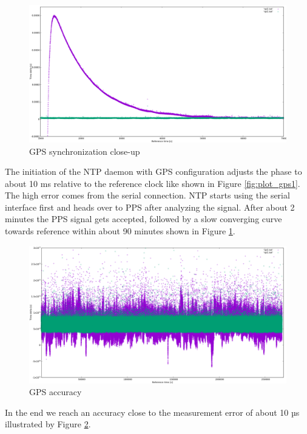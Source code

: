 \begin{figure}[tb]
	\centering
	\includegraphics[width=1.0\textwidth]{figures/plot_gps2.png}
	\caption{GPS synchronization close-up}
	\label{fig:plot_gps2}
\end{figure}

The initiation of the NTP daemon with GPS configuration adjusts the phase to about 10 ms relative to the reference clock like shown in Figure \ref{fig:plot_gps1}. The high error comes from the serial connection. NTP starts using the serial interface first and heads over to PPS after analyzing the signal. After about 2 minutes the PPS signal gets accepted, followed by a slow converging curve towards reference within about 90 minutes shown in Figure \ref{fig:plot_gps2}.

\begin{figure}[tb]
	\centering
	\includegraphics[width=1.0\textwidth]{figures/plot_gps3.png}
	\caption{GPS accuracy}
	\label{fig:plot_gps3}
\end{figure}

In the end we reach an accuracy close to the measurement error of about 10 µs illustrated by Figure \ref{fig:plot_gps3}.

